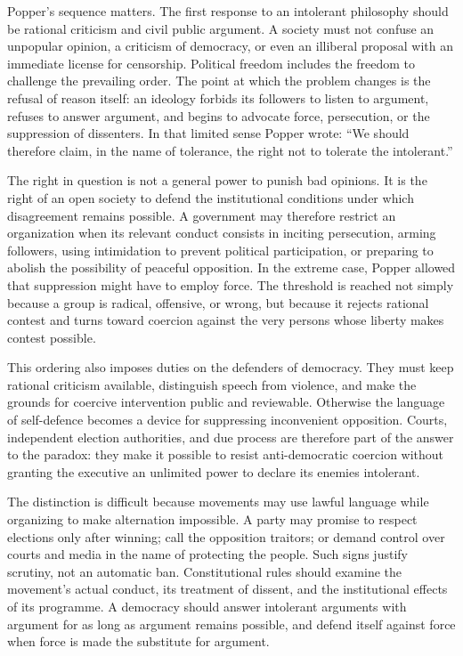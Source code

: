 ﻿\documentclass[12pt,a4paper]{book}
\begin{document}
Popper's sequence matters.  The first response to an intolerant philosophy
should be rational criticism and civil public argument.  A society must not
confuse an unpopular opinion, a criticism of democracy, or even an illiberal
proposal with an immediate license for censorship.  Political freedom
includes the freedom to challenge the prevailing order.  The point at which
the problem changes is the refusal of reason itself: an ideology forbids its
followers to listen to argument, refuses to answer argument, and begins to
advocate force, persecution, or the suppression of dissenters.  In that
limited sense Popper wrote: ``We should therefore claim, in the name of
tolerance, the right not to tolerate the intolerant.''

The right in question is not a general power to punish bad opinions.  It is
the right of an open society to defend the institutional conditions under
which disagreement remains possible.  A government may therefore restrict
an organization when its relevant conduct consists in inciting persecution,
arming followers, using intimidation to prevent political participation, or
preparing to abolish the possibility of peaceful opposition.  In the extreme
case, Popper allowed that suppression might have to employ force.  The
threshold is reached not simply because a group is radical, offensive, or
wrong, but because it rejects rational contest and turns toward coercion
against the very persons whose liberty makes contest possible.

This ordering also imposes duties on the defenders of democracy.  They must
keep rational criticism available, distinguish speech from violence, and
make the grounds for coercive intervention public and reviewable.  Otherwise
the language of self-defence becomes a device for suppressing inconvenient
opposition.  Courts, independent election authorities, and due process are
therefore part of the answer to the paradox: they make it possible to resist
anti-democratic coercion without granting the executive an unlimited power
to declare its enemies intolerant.

The distinction is difficult because movements may use lawful language while
organizing to make alternation impossible.  A party may promise to respect
elections only after winning; call the opposition traitors; or demand control
over courts and media in the name of protecting the people.  Such signs
justify scrutiny, not an automatic ban.  Constitutional rules should examine
the movement's actual conduct, its treatment of dissent, and the institutional
effects of its programme.  A democracy should answer intolerant arguments
with argument for as long as argument remains possible, and defend itself
against force when force is made the substitute for argument.
\end{document}
